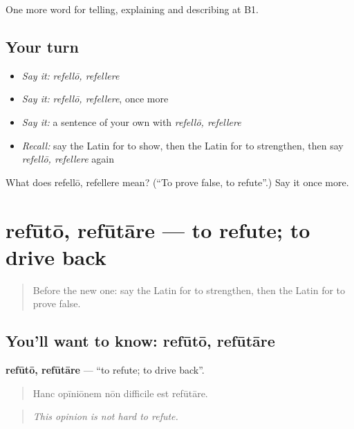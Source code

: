 \begin{grammarlens}[title={What you've built}]
One more word for telling, explaining and describing at B1.
\end{grammarlens}

\subsection*{Your turn}
\begin{itemize}
\raggedright
  \item \emph{Say it:} \emph{refellō, refellere}
  \item \emph{Say it:} \emph{refellō, refellere}, once more
  \item \emph{Say it:} a sentence of your own with \emph{refellō, refellere}
  \item \emph{Recall:} say the Latin for to show, then the Latin for to strengthen, then say \emph{refellō, refellere} again
\end{itemize}

\begin{tcolorbox}[breakable,colback=teal!4,colframe=teal!35!black,title={Before you move on}]
What does refellō, refellere mean? (\textquotedblleft{}To prove false, to refute\textquotedblright{}.) Say it once more.
\end{tcolorbox}
\section[refūtō, refūtāre]{refūtō, refūtāre — to refute; to drive back}

\label{lesson:LA-C362-refuto}



\begin{quote}
Before the new one: say the Latin for to strengthen, then the Latin for to prove false.
\end{quote}

\subsection*{You'll want to know: refūtō, refūtāre}
\textbf{refūtō, refūtāre} — \textquotedblleft{}to refute; to drive back\textquotedblright{}.

\begin{quote}
Hanc opīniōnem nōn difficile est refūtāre.
\end{quote}

\begin{quote}
\emph{This opinion is not hard to refute.}
\end{quote}

